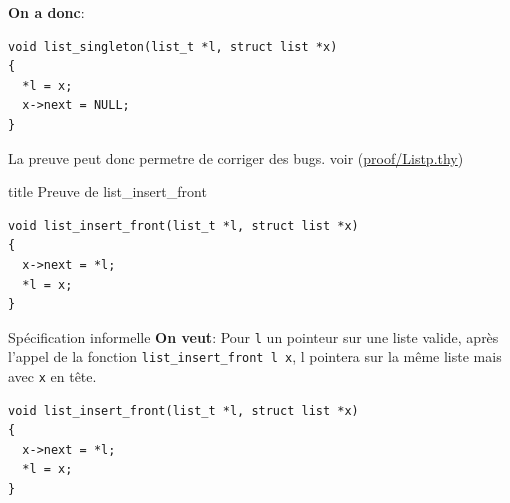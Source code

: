 \documentclass[hyperref={pdfpagelabels=false}]{beamer}
\begin{document}
\begin{frame}[fragile]
\textbf{On a donc}:
  \begin{center}
    \begin{minipage}{0.8\textwidth}
      \begin{verbatim}
void list_singleton(list_t *l, struct list *x)
{
  *l = x;
  x->next = NULL;
}
      \end{verbatim}
    \end{minipage}
  \end{center}
  La preuve peut donc permetre de corriger des bugs.
  \vfill
  \hfill
  {\tiny voir (\url{proof/Listp.thy})}
\end{frame}


\begin{frame}[fragile]
  \vfill
  \centering
  \begin{beamercolorbox}[sep=8pt,center,shadow=true,rounded=true]{title}
    Preuve de list\_insert\_front\par%
  \end{beamercolorbox}
  \vfill
  \begin{center}
    \begin{minipage}{0.8\textwidth}
      \begin{verbatim}
void list_insert_front(list_t *l, struct list *x)
{
  x->next = *l;
  *l = x;
} 
      \end{verbatim}
    \end{minipage}
  \end{center}
\end{frame}

\begin{frame}[fragile]{Spécification informelle}
  \textbf{On veut}: Pour \texttt{l} un pointeur sur une liste valide, après l'appel de la fonction \texttt{list\_insert\_front l x}, l pointera sur la même liste mais avec \texttt{x} en tête. \\
  \vfill
  \begin{center}
    \begin{minipage}{0.8\textwidth}
      \begin{verbatim}
void list_insert_front(list_t *l, struct list *x)
{
  x->next = *l;
  *l = x;
} 
      \end{verbatim}
    \end{minipage}
  \end{center}

\end{frame}
\end{document}
